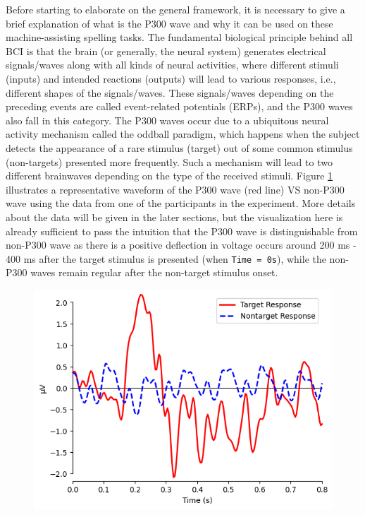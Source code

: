 \documentclass{article}
\begin{document}
\vspace{-3mm}
Before starting to elaborate on the general framework, it is necessary to give a brief explanation of what is the P300 wave and why it can be used on these machine-assisting spelling tasks. The fundamental biological principle behind all BCI is that the brain (or generally, the neural system) generates electrical signals/waves along with all kinds of neural activities, where different stimuli (inputs) and intended reactions (outputs) will lead to various responses, i.e., different shapes of the signals/waves. These signals/waves depending on the preceding events are called event-related potentials (ERPs), and the P300 waves also fall in this category. The P300 waves occur due to a ubiquitous neural activity mechanism called the oddball paradigm, which happens when the subject detects the appearance of a rare stimulus (target) out of some common stimulus (non-targets) presented more frequently. Such a mechanism will lead to two different brainwaves depending on the type of the received stimuli. Figure \ref{fig:1} illustrates a representative waveform of the P300 wave (red line) VS non-P300 wave using the data from one of the participants in the experiment. More details about the data will be given in the later sections, but the visualization here is already sufficient to pass the intuition that the P300 wave is distinguishable from non-P300 wave as there is a positive deflection in voltage occurs around 200 ms - 400 ms after the target stimulus is presented (when \texttt{Time = 0s}), while the non-P300 waves remain regular after the non-target stimulus onset.

\vspace{-3mm}
\begin{figure}[H]
	\centering
	\includegraphics[width=0.5\linewidth]{waves.png}
	\vspace*{-1.5mm}
	\label{fig:1}
\end{figure}
\end{document}
